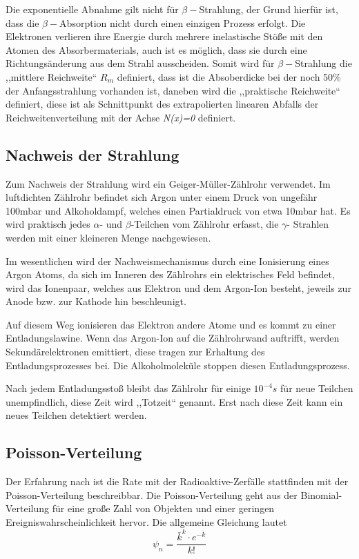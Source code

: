 Die exponentielle Abnahme gilt nicht für $\beta-$Strahlung, der Grund
hierfür ist, dass die $\beta-$Absorption nicht durch einen einzigen
Prozess erfolgt. Die Elektronen verlieren ihre Energie durch mehrere
inelastische Stöße mit den Atomen des Absorbermaterials, auch ist
es möglich, dass sie durch eine Richtungsänderung aus dem Strahl ausscheiden.
Somit wird für $\beta-$Strahlung die ,,mittlere Reichweite`` $R_{m}$
definiert, dass ist die Absoberdicke bei der noch 50\% der Anfangsstrahlung
vorhanden ist, daneben wird die ,,praktische Reichweite`` definiert,
diese ist als Schnittpunkt des extrapolierten linearen Abfalls der
Reichweitenverteilung mit der Achse \emph{N(x)=0 }definiert.


\subsection{Nachweis der Strahlung}

Zum Nachweis der Strahlung wird ein Geiger-Müller-Zählrohr verwendet.
Im luftdichten Zählrohr befindet sich Argon unter einem Druck von
ungefähr 100mbar und Alkoholdampf, welches einen Partialdruck von
etwa 10mbar hat. Es wird praktisch jedes $\alpha$- und $\beta$-Teilchen
vom Zählrohr erfasst, die $\gamma$- Strahlen werden mit einer kleineren
Menge nachgewiesen.

Im wesentlichen wird der Nachweismechanismus durch eine Ionisierung
eines Argon Atoms, da sich im Inneren des Zählrohrs ein elektrisches
Feld befindet, wird das Ionenpaar, welches aus Elektron und dem Argon-Ion
besteht, jeweils zur Anode bzw. zur Kathode hin beschleunigt. 

Auf diesem Weg ionisieren das Elektron andere Atome und es kommt zu
einer Entladungslawine. Wenn das Argon-Ion auf die Zählrohrwand auftrifft,
werden Sekundärelektronen emittiert, diese tragen zur Erhaltung des
Entladungsprozesses bei. Die Alkoholmoleküle stoppen diesen Entladungsprozess.

Nach jedem Entladungsstoß bleibt das Zählrohr für einige $10^{-4}s$
für neue Teilchen unempfindlich, diese Zeit wird ,,Totzeit`` genannt.
Erst nach diese Zeit kann ein neues Teilchen detektiert werden.


\subsection{Poisson-Verteilung}

Der Erfahrung nach ist die Rate mit der Radioaktive-Zerfälle stattfinden
mit der Poisson-Verteilung beschreibbar. Die Poisson-Verteilung geht
aus der Binomial-Verteilung für eine große Zahl von Objekten und einer
geringen Ereigniswahrscheinlichkeit hervor. Die allgemeine Gleichung
lautet 
\begin{equation}
	\psi_{n}=\frac{\bar{k}^{k}\cdot e^{-\bar{k}}}{k!}\label{eq:Poisson-Verteilung allgemein}
\end{equation}


